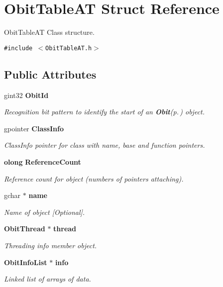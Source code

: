 \section{Obit\-Table\-AT Struct Reference}
\label{structObitTableAT}
Obit\-Table\-AT Class structure.  


{\tt \#include $<$Obit\-Table\-AT.h$>$}

\subsection*{Public Attributes}
\begin{CompactItemize}
\item 
gint32 {\bf Obit\-Id}
\begin{CompactList}\small\item\em Recognition bit pattern to identify the start of an {\bf Obit}{\rm (p.\,\pageref{structObit})} object. \item\end{CompactList}\item 
gpointer {\bf Class\-Info}
\begin{CompactList}\small\item\em Class\-Info pointer for class with name, base and function pointers. \item\end{CompactList}\item 
{\bf olong} {\bf Reference\-Count}
\begin{CompactList}\small\item\em Reference count for object (numbers of pointers attaching). \item\end{CompactList}\item 
gchar $\ast$ {\bf name}
\begin{CompactList}\small\item\em Name of object [Optional]. \item\end{CompactList}\item 
{\bf Obit\-Thread} $\ast$ {\bf thread}
\begin{CompactList}\small\item\em Threading info member object. \item\end{CompactList}\item 
{\bf Obit\-Info\-List} $\ast$ {\bf info}
\begin{CompactList}\small\item\em Linked list of arrays of data. \item\end{CompactList}\item 

\end{CompactItemize}

